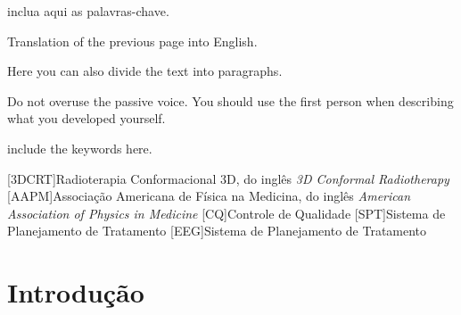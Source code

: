 \documentclass[a4paper, 12pt]{ppgeb}
\begin{document}
inclua aqui as palavras-chave.
\acresetall %
\clearpage
\restoregeometry
\acresetall %
\vspace{24pt}

Translation of the previous page into English.

Here you can also divide the text into paragraphs.

Do not overuse the passive voice. You should use the first person when describing what you developed yourself.

\vspace{14pt}

include the keywords here.
\acresetall %

\indice

\begin{center}

{\bfseries{} }%
\end{center}

[3DCRT]{Radioterapia Conformacional 3D, do inglês \emph{3D Conformal Radiotherapy}}
[AAPM]{Associação Americana de Física na Medicina, do inglês \emph{American Association of Physics in Medicine}}
[CQ]{Controle de Qualidade}
[SPT]{Sistema de Planejamento de Tratamento}
[EEG]{Sistema de Planejamento de Tratamento}

\begin{acronym}
\end{acronym}

\clearpage


\acresetall %

\chapter{Introdução}
\end{document}
